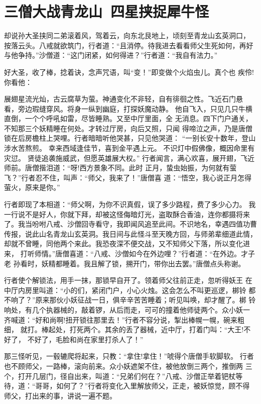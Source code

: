 \chapter{三僧大战青龙山~四星挟捉犀牛怪}

却说孙大圣挟同二弟滚着风，驾着云，向东北艮地上，顷刻至青龙山玄英洞口，
按落云头。八戒就欲筑门，行者道：“且消停。待我进去看看师父生死如何，再好
与他争持。”沙僧道：“这门闭紧，如何得进？”行者道：“我自有法力。”

好大圣，收了棒，捻着诀，念声咒语，叫“变！”即变做个火焰虫儿。真个也
疾伶!你看他：

展翅星流光灿，古云腐草为萤。神通变化不非轻，自有徘徊之性。飞近石门悬
看，旁边瑕缝穿风。将身一纵到幽庭，打探妖魔动静。
他自飞入，只见几只牛横直倒，一个个呼吼如雷，尽皆睡熟。又至中厅里面，全
无消息。四下门户通关，不知那三个妖精睡在何处。才转过厅房，向后又照，只闻
得啼泣之声，乃是唐僧锁在后房檐柱上哭哩。行者暗暗听他哭甚，只见他哭道：
“一别长安十数年，登山涉水苦熬煎。
幸来西域逢佳节，喜到金平遇上元。
不识灯中假佛像，概因命里有灾愆。
贤徒追袭施威武，但愿英雄展大权。”
行者闻言，满心欢喜，展开翅，飞近师前。唐僧揩泪道：“呀!西方景象不同。此时
正月，蛰虫始振，为何就有萤飞？”行者忍不住，叫声：“师父，我来了！”唐僧喜
道：“悟空，我心说正月怎得萤火，原来是你。”

行者即现了本相道：“师父啊，为你不识真假，误了多少路程，费了多少心力。
我一行说不是好人，你就下拜，却被这怪侮暗灯光，盗取酥合香油，连你都摄将来
了。我当吩咐八戒、沙僧回寺看守，我即闻风追至此间。不识地名，幸遇四值功曹
传报，说此山名青龙山玄英洞。我日间与此怪斗至天晚方回，与师弟辈细道此情，
却就不曾睡，同他两个来此。我恐夜深不便交战，又不知师父下落，所以变化进来，
打听师情。”唐僧喜道：“八戒、沙僧如今在外边哩？”行者道：“在外边。才子老
孙看时，妖精都睡着。我且解了锁，搠开门，带你出去罢。”唐僧点头称谢。

行者使个解锁法，用手一抹，那锁早自开了。领着师父往前正走，忽听得妖王
在中厅内房里叫道：“小的们，紧闭门户，小心火烛。这会怎么不叫更巡逻，梆铃
都不响了？”原来那伙小妖征战一日，俱辛辛苦苦睡着；听见叫唤，却才醒了。梆
铃响处，有几个执器械的，敲着锣，从后而走，可可的撞着他师徒两个。众小妖一
齐喊道：“好和尚啊!扭开锁往那里去！”行者不容分说，掣出棒幌一幌，碗来粗细，
就打。棒起处，打死两个。其余的丢了器械，近中厅，打着门叫：“大王!不好了，
不好了，毛脸和尚在家里打杀人了！”

那三怪听见，一毂辘爬将起来，只教：“拿住!拿住！”唬得个唐僧手软脚软。
行者也不顾师父，一路棒，滚向前来。众小妖遮架不住，被他放倒三两个，推倒两
三个，打开几层门，径自出来，叫道：“兄弟们何在？”八戒、沙僧正举着钯杖等
待，道：“哥哥，如何了？”行者将变化入里解放师父，正走，被妖惊觉，顾不得
师父，打出来的事，讲说一遍不题。

